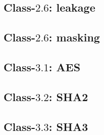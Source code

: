 
\subsection{Class-$2.6$: leakage}
\label{appx:instr_equiv:2:6}


\subsection{Class-$2.6$: masking}
\label{appx:instr_equiv:2:7}


\subsection{Class-$3.1$: AES}
\label{appx:instr_equiv:3:1}


\subsection{Class-$3.2$: SHA2}
\label{appx:instr_equiv:3:2}


\subsection{Class-$3.3$: SHA3}
\label{appx:instr_equiv:3:3}

